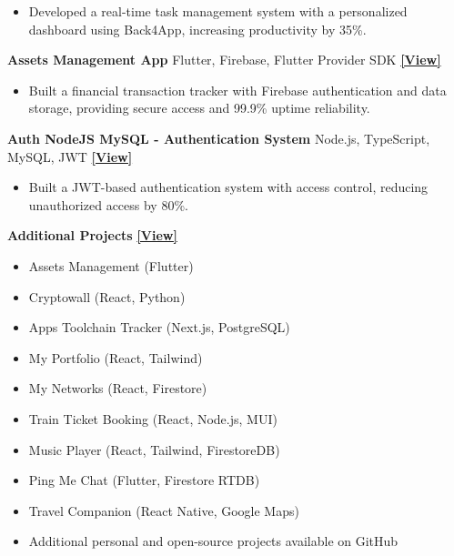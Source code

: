 \documentclass[10pt,a4paper]{article}
\newcommand{\projectEntry}[3]{
    \textbf{#1} \hfill #2 \quad
    \href{#3}{\textbf{[View]}}
}
\begin{document}
\begin{itemize}
    \item Developed a real-time task management system with a personalized dashboard using Back4App, increasing productivity by 35\%.
\end{itemize}


\projectEntry
{Assets Management App}
{Flutter, Firebase, Flutter Provider SDK}
{https://github.com/Tauqeer-Ahmed-99/Flutter-Assets-Management-App}

\begin{itemize}
    \item Built a financial transaction tracker with Firebase authentication and data storage, providing secure access and 99.9\% uptime reliability.
\end{itemize}


\projectEntry
{Auth NodeJS MySQL - Authentication System}
{Node.js, TypeScript, MySQL, JWT}
{https://github.com/Tauqeer-Ahmed-99/Auth-NodeJS-MySQL}

\begin{itemize}
    \item Built a JWT-based authentication system with access control, reducing unauthorized access by 80\%.
\end{itemize}


\projectEntry
{Additional Projects}
{}
{https://github.com/Tauqeer-Ahmed-99}

\begin{itemize}
    \item Assets Management (Flutter)
    \item Cryptowall (React, Python)
    \item Apps Toolchain Tracker (Next.js, PostgreSQL)
    \item My Portfolio (React, Tailwind)
    \item My Networks (React, Firestore)
    \item Train Ticket Booking (React, Node.js, MUI)
    \item Music Player (React, Tailwind, FirestoreDB)
    \item Ping Me Chat (Flutter, Firestore RTDB)
    \item Travel Companion (React Native, Google Maps)
    \item Additional personal and open-source projects available on GitHub
\end{itemize}
\end{document}
